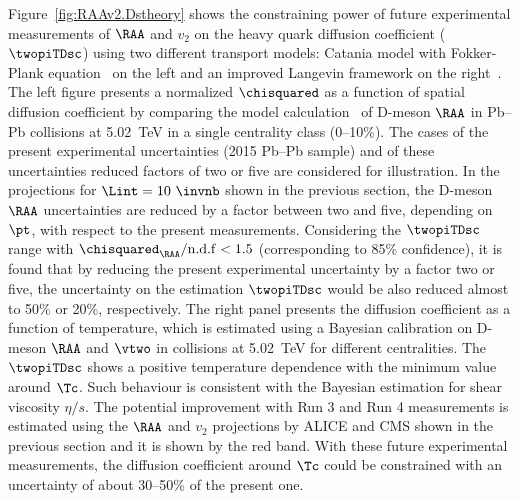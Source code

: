 Figure~\ref{fig:RAAv2.Dstheory} shows the constraining power of future experimental measurements of  $\RAA$ and $v_2$ on the heavy quark diffusion coefficient ($\twopiTDsc$) using two different transport models: Catania model with Fokker-Plank equation~\cite{Das:2015ana,Das:2013kea} on the left and an improved Langevin framework on the right~\cite{PhysRevC.97.014907}. The left figure presents a normalized $\chisquared$ as a function of spatial diffusion coefficient by comparing the model calculation~\cite{Das:2015ana,Das:2013kea} of D-meson $\RAA$ in Pb--Pb collisions at 5.02~TeV in a single centrality class (0--10\%). 
The cases of the present experimental uncertainties (2015 Pb--Pb sample) and of these uncertainties reduced factors of two or five are considered for illustration. In the projections for $\Lint=10~\invnb$ shown in the previous section, the D-meson $\RAA$ uncertainties are reduced by a factor between two and five, depending on $\pt$, with respect to the present measurements.
Considering the $\twopiTDsc$ range with $\chisquared_{\RAA}/{\rm n.d.f}<1.5$ (corresponding to 85\% confidence), it is found that by reducing the present experimental uncertainty by a factor two or five, the uncertainty on the estimation $\twopiTDsc$ would be also reduced almost to 50$\%$ or 20\%, respectively. The right panel presents the diffusion coefficient as a function of temperature, which is estimated using a Bayesian calibration on D-meson $\RAA$ and $\vtwo$ in \PbPb collisions at 5.02~TeV for different centralities. The $\twopiTDsc$ shows a positive temperature dependence with the minimum value around $\Tc$. Such behaviour is consistent with the Bayesian estimation for shear viscosity $\eta/s$. The potential improvement with Run 3 and Run 4 measurements is estimated using the $\RAA$ and $v_2$ projections by ALICE and CMS shown in the previous section and it is shown by the red band. With these future experimental measurements, the diffusion coefficient around $\Tc$ could be constrained with an uncertainty of about 30--50\% of the present one. 




